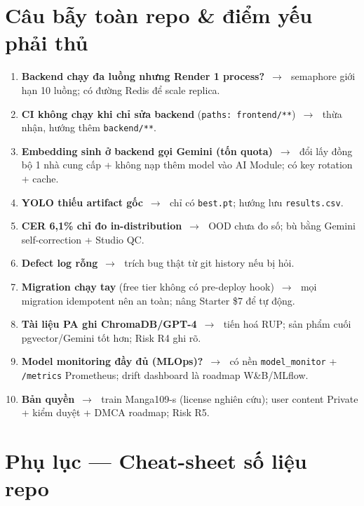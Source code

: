 \documentclass[11pt]{article}
\newcommand{\arr}{\,\ensuremath{\rightarrow}\,}
\newcommand{\code}[1]{\texttt{\small #1}}
\newcommand{\B}[1]{\textbf{#1}}
\begin{document}
\section{Câu bẫy toàn repo \& điểm yếu phải thủ}

\begin{enumerate}[leftmargin=1.6em,itemsep=3pt]
  \item \B{Backend chạy đa luồng nhưng Render 1 process?} \arr\ semaphore giới hạn 10 luồng; có đường Redis để scale replica.
  \item \B{CI không chạy khi chỉ sửa backend} (\code{paths: frontend/**}) \arr\ thừa nhận, hướng thêm \code{backend/**}.
  \item \B{Embedding sinh ở backend gọi Gemini (tốn quota)} \arr\ đổi lấy đồng bộ 1 nhà cung cấp + không nạp thêm model vào AI Module; có key rotation + cache.
  \item \B{YOLO thiếu artifact gốc} \arr\ chỉ có \code{best.pt}; hướng lưu \code{results.csv}.
  \item \B{CER 6,1\% chỉ đo in-distribution} \arr\ OOD chưa đo số; bù bằng Gemini self-correction + Studio QC.
  \item \B{Defect log rỗng} \arr\ trích bug thật từ git history nếu bị hỏi.
  \item \B{Migration chạy tay} (free tier không có pre-deploy hook) \arr\ mọi migration idempotent nên an toàn; nâng Starter \$7 để tự động.
  \item \B{Tài liệu PA ghi ChromaDB/GPT-4} \arr\ tiến hoá RUP; sản phẩm cuối pgvector/Gemini tốt hơn; Risk R4 ghi rõ.
  \item \B{Model monitoring đầy đủ (MLOps)?} \arr\ có nền \code{model\_monitor} + \code{/metrics} Prometheus; drift dashboard là roadmap W\&B/MLflow.
  \item \B{Bản quyền} \arr\ train Manga109-s (license nghiên cứu); user content Private + kiểm duyệt + DMCA roadmap; Risk R5.
\end{enumerate}

\section{Phụ lục --- Cheat-sheet số liệu repo}
\end{document}
